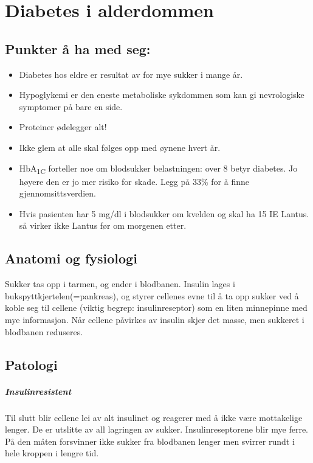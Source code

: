 	\chapter{Diabetes i alderdommen}%
		\section{Punkter å ha med seg:}
			\begin{itemize}
				\item Diabetes hos eldre er resultat av for mye sukker i mange år.\\
				\item Hypoglykemi er den eneste metaboliske sykdommen som kan gi nevrologiske symptomer på bare en side.\\
				\item Proteiner ødelegger alt!\\
				\item Ikke glem at alle skal følges opp med øynene hvert år.\\
				\item HbA\textsubscript{1C} forteller noe om blodsukker belastningen: over 8 betyr diabetes. Jo høyere den er jo mer risiko for skade. Legg på 33\% for å finne gjennomsittsverdien.\\
				\item Hvis pasienten har 5 mg/dl i blodsukker om kvelden og skal ha 15 IE Lantus\textregistered. så virker ikke Lantus før om morgenen etter.\\
			\end{itemize}
		\section{Anatomi og fysiologi}
			Sukker tas opp i tarmen, og ender i blodbanen. Insulin lages i bukspyttkjertelen(=pankreas), og styrer cellenes evne til å ta opp sukker ved å koble seg til cellene (viktig begrep: insulinreseptor) som en liten minnepinne med mye informasjon. Når cellene påvirkes av insulin skjer det masse, men sukkeret i blodbanen reduseres.
		\section{Patologi}
			\paragraph{Insulinresistent\\}
				Til slutt blir cellene lei av alt insulinet og reagerer med å ikke være mottakelige lenger. De er utslitte av all lagringen av sukker. Insulinreseptorene blir mye ferre. På den måten forsvinner ikke sukker fra blodbanen lenger men svirrer rundt i hele kroppen i lengre tid.
